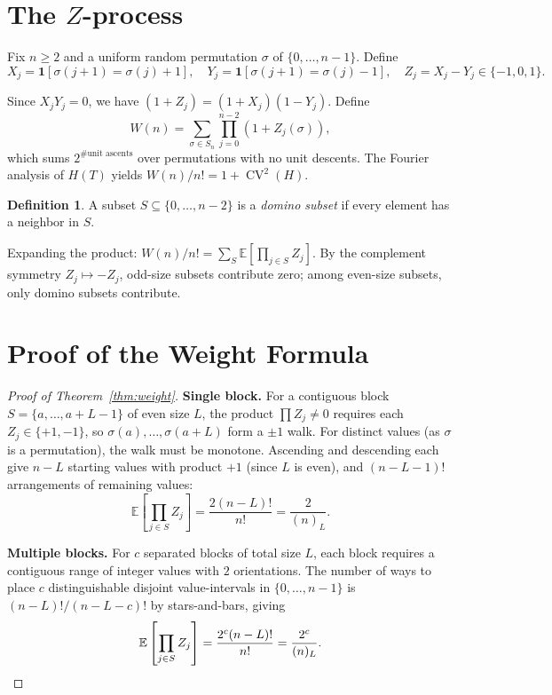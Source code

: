 \documentclass[11pt]{amsart}
\theoremstyle{definition}
\newtheorem{definition}[theorem]{Definition}
\DeclareMathOperator{\CV}{CV}
\begin{document}
\section{The $Z$-process}

Fix $n \geq 2$ and a uniform random permutation $\sigma$ of $\{0,\ldots,n{-}1\}$. Define
\[
X_j = \mathbf{1}[\sigma(j{+}1)=\sigma(j){+}1],\quad Y_j = \mathbf{1}[\sigma(j{+}1)=\sigma(j){-}1],\quad Z_j = X_j - Y_j \in \{-1,0,1\}.
\]

Since $X_jY_j = 0$, we have $(1+Z_j) = (1+X_j)(1-Y_j)$. Define
\[
W(n) = \sum_{\sigma \in S_n} \prod_{j=0}^{n-2}(1+Z_j(\sigma)),
\]
which sums $2^{\#\text{unit ascents}}$ over permutations with no unit descents. The Fourier analysis of $H(T)$ yields $W(n)/n! = 1 + \CV^2(H)$.

\begin{definition}
A subset $S \subseteq \{0,\ldots,n{-}2\}$ is a \emph{domino subset} if every element has a neighbor in $S$.
\end{definition}

Expanding the product: $W(n)/n! = \sum_S \mathbb{E}[\prod_{j \in S} Z_j]$. By the complement symmetry $Z_j \mapsto -Z_j$, odd-size subsets contribute zero; among even-size subsets, only domino subsets contribute.

\section{Proof of the Weight Formula}

\begin{proof}[Proof of Theorem~\ref{thm:weight}]
\textbf{Single block.} For a contiguous block $S = \{a,\ldots,a{+}L{-}1\}$ of even size $L$, the product $\prod Z_j \neq 0$ requires each $Z_j \in \{+1,-1\}$, so $\sigma(a),\ldots,\sigma(a{+}L)$ form a $\pm 1$ walk. For distinct values (as $\sigma$ is a permutation), the walk must be monotone. Ascending and descending each give $n{-}L$ starting values with product $+1$ (since $L$ is even), and $(n{-}L{-}1)!$ arrangements of remaining values:
\[
\mathbb{E}\left[\prod_{j \in S} Z_j\right] = \frac{2(n-L)!}{n!} = \frac{2}{(n)_L}.
\]

\textbf{Multiple blocks.} For $c$ separated blocks of total size $L$, each block requires a contiguous range of integer values with $2$ orientations. The number of ways to place $c$ distinguishable disjoint value-intervals in $\{0,\ldots,n{-}1\}$ is $(n{-}L)!/(n{-}L{-}c)!$ by stars-and-bars, giving
\[
\mathbb{E}\left[\prod_{j \in S} Z_j\right] = \frac{2^c(n-L)!}{n!} = \frac{2^c}{(n)_L}.\qedhere
\]
\end{proof}
\end{document}
